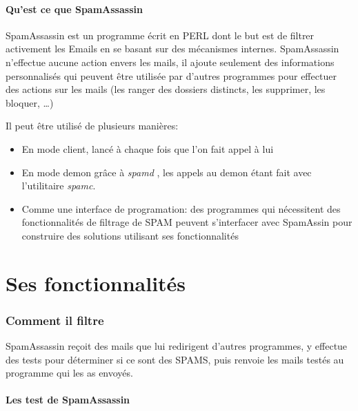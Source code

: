 \documentclass[a4paper,11pt]{article}
\begin{document}
\subsection{Qu'est ce que SpamAssassin}

SpamAssassin est un programme écrit en PERL dont le but est de filtrer activement les Emails en se basant sur des mécanismes internes. 
SpamAssassin n'effectue aucune action envers les mails, il ajoute seulement des informations personnalisés
qui peuvent être utilisée par d'autres programmes pour effectuer des actions sur les mails (les ranger des dossiers distincts, les supprimer, les bloquer, \dots)


Il peut être utilisé de plusieurs manières:
\begin{itemize}
 \item En mode client, lancé à chaque fois que l'on fait appel à lui
 \item En mode demon grâce à \emph{spamd} , les appels au demon étant fait avec l'utilitaire \emph{spamc}.
 \item Comme une interface de programation: des programmes qui nécessitent des fonctionnalités de filtrage de SPAM peuvent s'interfacer avec SpamAssin
 pour construire des solutions utilisant ses fonctionnalités
\end{itemize}

\pagebreak

\part{Ses fonctionnalités}

\section{Comment il filtre}

SpamAssassin reçoit des mails que lui redirigent d'autres programmes, y effectue des tests pour déterminer si ce sont des SPAMS, 
puis renvoie les mails testés au programme qui les as envoyés.

\subsection{Les test de SpamAssassin }
\end{document}
